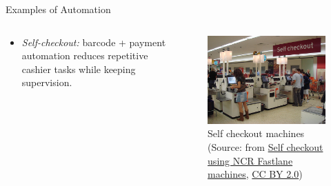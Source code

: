 \begin{frame}{Examples of Automation}
	\begin{columns}
		\begin{column}{0.25\textwidth}
			\begin{itemize}
  				\item \emph{Self-checkout:} barcode + payment automation reduces repetitive cashier tasks while keeping supervision.
			\end{itemize}
		\end{column}
		\begin{column}{0.75\textwidth}
				\begin{figure}
				\centering
				\includegraphics[width=0.7\linewidth]{fig/lec01/Self_checkout.jpg}
				\caption*{Self checkout machines (Source: from \href{https://commons.wikimedia.org/wiki/File:Self_checkout_using_NCR_Fastlane_machines.jpg}{Self checkout using NCR Fastlane machines}, \href{https://creativecommons.org/licenses/by/2.0/deed.en}{CC BY 2.0})}
			\end{figure}
		\end{column}
\end{columns}
\end{frame}

